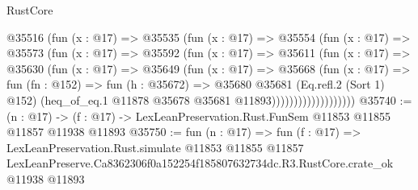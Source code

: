 \begin{lexlean}{RustCore}
\begin{coremodule}
                    @35516
                      (fun (x : @17) =>
                      @35535
                        (fun (x : @17) =>
                        @35554
                          (fun (x : @17) =>
                          @35573
                            (fun (x : @17) =>
                            @35592
                              (fun (x : @17) =>
                              @35611
                                (fun (x : @17) =>
                                @35630
                                  (fun (x : @17) =>
                                  @35649
                                    (fun (x : @17) =>
                                    @35668
                                      (fun (x : @17) =>
                                      fun (fn : @152) =>
                                      fun (h : @35672) =>
                                      @35680
                                        @35681
                                        (Eq.refl.{2} (Sort 1) @152)
                                        (heq_of_eq.{1}
                                          @11878
                                          @35678
                                          @35681
                                          @11893)))))))))))))))))))
@35740 := (n : @17) ->
  (f : @17) -> LexLeanPreservation.Rust.FunSem @11853 @11855 @11857 @11938 @11893
@35750 := fun (n : @17) =>
  fun (f : @17) =>
  LexLeanPreservation.Rust.simulate
    @11853
    @11855
    @11857
    LexLeanPreserve.Ca8362306f0a152254f185807632734dc.R3.RustCore.crate_ok
    @11938
    @11893
\end{coremodule}
\end{lexlean}
